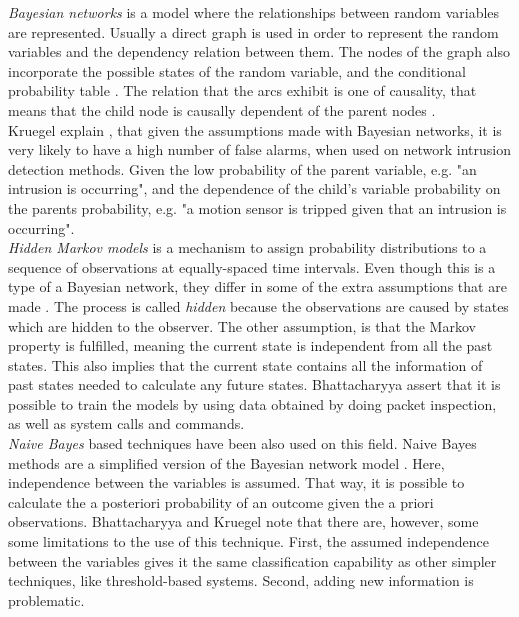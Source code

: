 \begin{itemize}
\textit{Bayesian networks} is a model where the relationships between random variables are represented. Usually a direct graph is used in order to represent the random variables and the dependency relation between them. The nodes of the graph also incorporate the possible states of the random variable, and the conditional probability table \cite{Kruegel:2003:BEC:956415.956436}. The relation that the arcs exhibit is one of causality, that means that the child node is causally dependent of the parent nodes \cite{Kruegel:2003:BEC:956415.956436}. \\
Kruegel \etAl explain \cite{Kruegel:2003:BEC:956415.956436}, that given the assumptions made with Bayesian networks, it is very likely to have a high number of false alarms, when used on network intrusion detection methods. Given the low probability of the parent variable, e.g. "an intrusion is occurring", and the dependence of the child's variable probability on the parents probability, e.g. "a motion sensor is tripped given that an intrusion is occurring".  \\

\textit{Hidden Markov models} is a mechanism to assign probability distributions to a sequence of observations at equally-spaced time intervals. Even though this is a type of a Bayesian network, they differ in some of the extra assumptions that are made \cite{Ghahramani:2001:IHM:505741.505743}. The process is called \textit{hidden} because the observations are caused by states which are hidden to the observer. The other assumption, is that the Markov property is fulfilled, meaning the current state is independent from all the past states. This also implies that the current state contains all the information of past states needed to calculate any future states. Bhattacharyya \etAl assert that it is possible to train the models by using data obtained by doing packet inspection, as well as system calls and commands.\\

\textit{Naive Bayes} based techniques have been also used on this field. Naive Bayes methods are a simplified version of the Bayesian network model \cite{Langley:1992:ABC:1867135.1867170}. Here, independence between the variables is assumed. That way, it is possible to calculate the a posteriori probability of an outcome given the a priori observations. Bhattacharyya \etAl and Kruegel \etAl note that there are, however, some some limitations to the use of this technique. First, the assumed independence between the variables gives it the same classification capability as other simpler techniques, like threshold-based systems. Second, adding new information is problematic. \\


\end{itemize}
